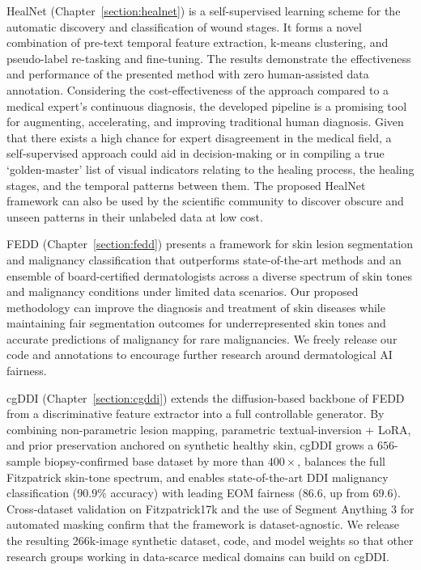 \documentclass[11pt]{ucthesis}
\begin{document}
HealNet (Chapter~\ref{section:healnet}) is a self-supervised learning scheme for the automatic discovery and classification of wound stages. It forms a novel combination of pre-text temporal feature extraction, k-means clustering, and pseudo-label re-tasking and fine-tuning. The results demonstrate the effectiveness and performance of the presented method with zero human-assisted data annotation. Considering the cost-effectiveness of the approach compared to a medical expert's continuous diagnosis, the developed pipeline is a promising tool for augmenting, accelerating, and improving traditional human diagnosis. Given that there exists a high chance for expert disagreement in the medical field, a self-supervised approach could aid in decision-making or in compiling a true `golden-master' list of visual indicators relating to the healing process, the healing stages, and the temporal patterns between them. The proposed HealNet framework can also be used by the scientific community to discover obscure and unseen patterns in their unlabeled data at low cost.

FEDD (Chapter~\ref{section:fedd}) presents a framework for skin lesion segmentation and malignancy classification that outperforms state-of-the-art methods and an ensemble of board-certified dermatologists across a diverse spectrum of skin tones and malignancy conditions under limited data scenarios. Our proposed methodology can improve the diagnosis and treatment of skin diseases while maintaining fair segmentation outcomes for underrepresented skin tones and accurate predictions of malignancy for rare malignancies. We freely release our code and annotations to encourage further research around dermatological AI fairness.

cgDDI (Chapter~\ref{section:cgddi}) extends the diffusion-based backbone of FEDD from a discriminative feature extractor into a full controllable generator. By combining non-parametric lesion mapping, parametric textual-inversion + LoRA, and prior preservation anchored on synthetic healthy skin, cgDDI grows a $656$-sample biopsy-confirmed base dataset by more than $400\times$, balances the full Fitzpatrick skin-tone spectrum, and enables state-of-the-art DDI malignancy classification ($90.9\%$ accuracy) with leading EOM fairness ($86.6$, up from $69.6$). Cross-dataset validation on Fitzpatrick17k and the use of Segment Anything 3 for automated masking confirm that the framework is dataset-agnostic. We release the resulting 266k-image synthetic dataset, code, and model weights so that other research groups working in data-scarce medical domains can build on cgDDI.
\end{document}
